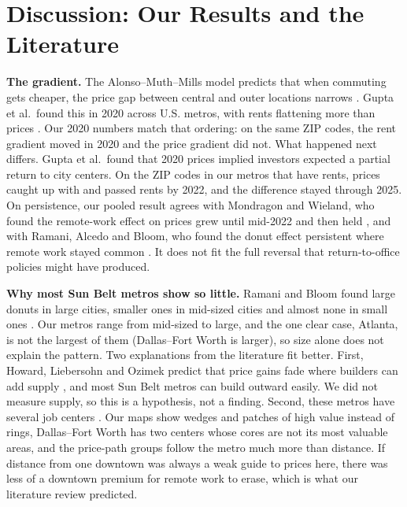 \documentclass[11pt]{article}
\begin{document}
\section{Discussion: Our Results and the Literature}

\textbf{The gradient.} The Alonso--Muth--Mills model predicts that when commuting gets cheaper, the price gap between central and outer
locations narrows \cite{alonso}. Gupta et al.\ found this in 2020 across U.S. metros, with rents flattening more than prices
\cite{gupta}. Our 2020 numbers match that ordering: on the same ZIP codes, the rent gradient moved in 2020 and the price gradient did
not. What happened next differs. Gupta et al.\ found that 2020 prices implied investors expected a partial return to city centers. On the ZIP codes in
our metros that have rents, prices caught up with and passed rents by 2022, and the difference stayed through 2025. On persistence, our pooled result agrees
with Mondragon and Wieland, who found the remote-work effect on prices grew until mid-2022 and then held \cite{mondragon}, and with
Ramani, Alcedo and Bloom, who found the donut effect persistent where remote work stayed common \cite{ramani24}. It does not fit the
full reversal that return-to-office policies might have produced.

\textbf{Why most Sun Belt metros show so little.} Ramani and Bloom found large donuts in large cities, smaller ones in mid-sized cities
and almost none in small ones \cite{ramani21}. Our metros range from mid-sized to large, and the one clear case, Atlanta, is not the largest
of them (Dallas--Fort Worth is larger), so size alone does not explain the pattern. Two explanations from the literature fit better. First, Howard, Liebersohn and Ozimek predict that
price gains fade where builders can add supply \cite{howard}, and most Sun Belt metros can build outward easily. We did not measure supply,
so this is a hypothesis, not a finding. Second, these metros have several job centers \cite{waddell,leslie}. Our maps show wedges and
patches of high value instead of rings, Dallas--Fort Worth has two centers whose cores are not its most valuable areas, and the price-path groups follow the metro much more than distance.
If distance from one downtown was always a weak guide to prices here, there was less of a downtown premium for remote work to erase, which
is what our literature review predicted.
\end{document}
